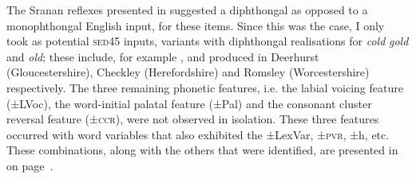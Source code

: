 {{{{{{{{{The Sranan reflexes presented in  suggested a diphthongal as opposed to a monophthongal English input, for these items. Since this was the case, I only took as potential  \textsc{sed45} inputs, variants with diphthongal realisations for \emph{cold} \emph{gold} and \emph{old}; these include, for example \textipa{[k\ae Uld]}, \textipa{[\ae Uld]} and \textipa{[goUld]} produced in Deerhurst (Gloucestershire), Checkley (Herefordshire) and Romsley (Worcestershire) respectively. The three remaining phonetic features, i.e. the labial voicing feature (±LVoc), the word-initial palatal feature (±Pal) and the consonant cluster reversal feature (±\textsc{ccr}), were not observed in isolation. These three features occurred with word variables that also exhibited the ±LexVar, ±\textsc{pvr}, ±h, etc. These combinations, along with the others that were identified, are presented in  on page~\pageref{Table 3.8}.
\clearpage

}}}}}}}}}
